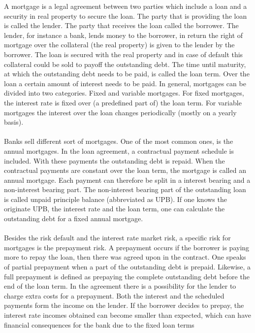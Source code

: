 A mortgage is a legal agreement between two parties which include a loan and 
a security in real property to secure the loan. The party that is providing 
the loan is called the lender. The party that receives the loan called 
the borrower. 
The lender, for instance a bank, lends money to the borrower, in return 
the right of mortgage over the collateral (the real property) is given to 
the lender by the borrower.
The loan is secured with the real property and in case of default 
this collateral could be sold to payoff the outstanding debt. The time 
until maturity, at which the outstanding debt needs to be paid, is 
called the loan term. 
Over the loan a certain amount of interest needs to be paid. In general, 
mortgages can be divided into two categories. Fixed and variable 
mortgages. For fixed mortgages, the interest rate is fixed over 
(a predefined part of) the loan term. For variable mortgages the 
interest over the loan changes periodically (mostly on a yearly basis).
\\\\
Banks sell different sort of mortgages. 
One of the most common ones, is the annual mortgages.  
In the loan agreement, a contractual payment schedule is included. 
With these payments the outstanding debt is repaid. When the contractual
payments are constant over the loan term, the mortgage is called 
an annual mortgage. Each payment can therefore be split in a 
interest bearing and a non-interest bearing part. The non-interest 
bearing part of the outstanding loan is called unpaid principle 
balance (abbreviated as UPB). If one knows the originate UPB, 
the interest rate and the loan term, one can calculate the 
outstanding debt for a fixed annual mortgage.  
\\\\
Besides the risk default and the interest rate market risk, 
a specific risk for mortgages is the prepayment risk. A prepayment 
occurs if the borrower is paying more to repay the loan, then there 
was agreed upon in the contract. One speaks of partial 
prepayment when a part of the outstanding debt is prepaid. 
Likewise, a full prepayment is defined as prepaying the complete 
outstanding debt before the end of the loan term. In the agreement 
there is a possibility for the lender to charge extra costs for a prepayment. 
Both the interest and the scheduled payments 
form the income on the lender. If the borrower decides to prepay, 
the interest rate incomes obtained can become smaller than expected, which 
can have financial consequences for the bank due to the fixed loan terms

